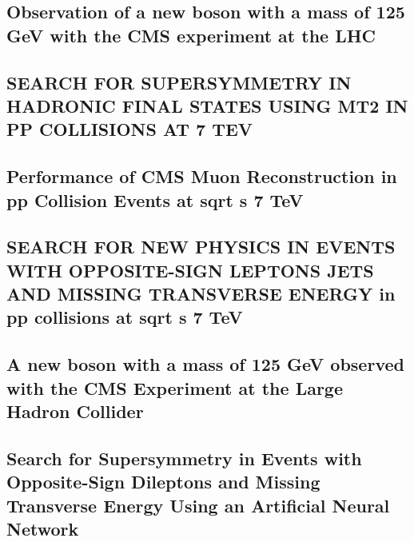 \documentclass[a4paper, 11pt, twoside, openright]{report}
\begin{document}
\subsection{Observation of a new boson with a mass of 125 GeV with the CMS experiment at the LHC }


\subsection{SEARCH FOR SUPERSYMMETRY IN HADRONIC FINAL STATES USING MT2 IN PP COLLISIONS AT 7 TEV}


\subsection{Performance of CMS Muon Reconstruction in pp Collision Events at sqrt s 7 TeV}


\subsection{SEARCH FOR NEW PHYSICS IN EVENTS WITH OPPOSITE-SIGN LEPTONS JETS AND MISSING TRANSVERSE ENERGY in pp collisions at sqrt s 7 TeV}


\subsection{A new boson with a mass of 125 GeV observed with the CMS Experiment at the Large Hadron Collider}


\subsection{Search for Supersymmetry in Events with Opposite-Sign Dileptons and Missing Transverse Energy Using an Artificial Neural Network}

\end{document}
